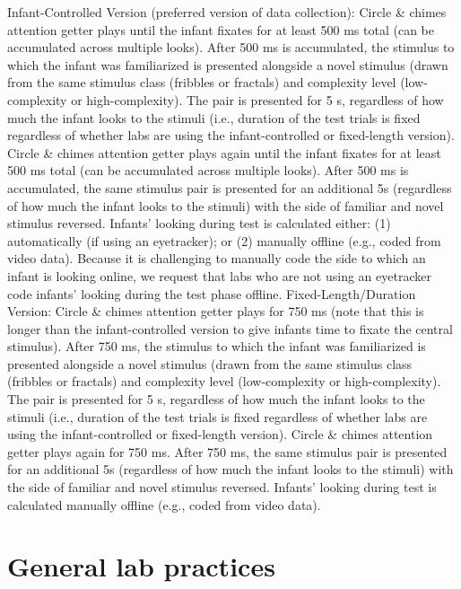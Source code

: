 \documentclass[
]{book}
\begin{document}
Infant-Controlled Version (preferred version of data collection):
Circle \& chimes attention getter plays until the infant fixates for at least 500 ms total (can be accumulated across multiple looks).
After 500 ms is accumulated, the stimulus to which the infant was familiarized is presented alongside a novel stimulus (drawn from the same stimulus class (fribbles or fractals) and complexity level (low-complexity or high-complexity). The pair is presented for 5 s, regardless of how much the infant looks to the stimuli (i.e., duration of the test trials is fixed regardless of whether labs are using the infant-controlled or fixed-length version).
Circle \& chimes attention getter plays again until the infant fixates for at least 500 ms total (can be accumulated across multiple looks).
After 500 ms is accumulated, the same stimulus pair is presented for an additional 5s (regardless of how much the infant looks to the stimuli) with the side of familiar and novel stimulus reversed.
Infants' looking during test is calculated either: (1) automatically (if using an eyetracker); or (2) manually offline (e.g., coded from video data). Because it is challenging to manually code the side to which an infant is looking online, we request that labs who are not using an eyetracker code infants' looking during the test phase offline.
Fixed-Length/Duration Version:
Circle \& chimes attention getter plays for 750 ms (note that this is longer than the infant-controlled version to give infants time to fixate the central stimulus).
After 750 ms, the stimulus to which the infant was familiarized is presented alongside a novel stimulus (drawn from the same stimulus class (fribbles or fractals) and complexity level (low-complexity or high-complexity). The pair is presented for 5 s, regardless of how much the infant looks to the stimuli (i.e., duration of the test trials is fixed regardless of whether labs are using the infant-controlled or fixed-length version).
Circle \& chimes attention getter plays again for 750 ms.
After 750 ms, the same stimulus pair is presented for an additional 5s (regardless of how much the infant looks to the stimuli) with the side of familiar and novel stimulus reversed.
Infants' looking during test is calculated manually offline (e.g., coded from video data).

\section{General lab practices}\label{general-lab-practices}
\end{document}
